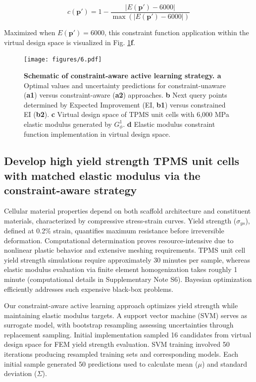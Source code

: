 \documentclass[preprint,review,12pt,authoryear]{elsarticle}
\begin{document}
\begin{equation}
    c(\boldsymbol{p}') = 1 - \frac{|E(\boldsymbol{p}') - 6000|}{\max(|E(\boldsymbol{p}') - 6000|)}
\label{eq:22}
\end{equation}

Maximized when $E(\boldsymbol{p}') = 6000$, this constraint function application within the virtual design space is visualized in Fig. \ref{fig:6}\textbf{f}.

\begin{figure}
    \centering
    \texttt{[image: figures/6.pdf]}
    \caption{\textbf{Schematic of constraint-aware active learning strategy. a} Optimal values and uncertainty predictions for constraint-unaware (\textbf{a1}) versus constraint-aware (\textbf{a2}) approaches. \textbf{b} Next query points determined by Expected Improvement (EI, \textbf{b1}) versus constrained EI (\textbf{b2}). \textbf{c} Virtual design space of TPMS unit cells with 6,000 MPa elastic modulus generated by $G_\phi^1$. \textbf{d} Elastic modulus constraint function implementation in virtual design space.}
    \label{fig:6}
\end{figure}

\subsection{Develop high yield strength TPMS unit cells with matched elastic modulus via the constraint-aware strategy}

Cellular material properties depend on both scaffold architecture and constituent materials, characterized by compressive stress-strain curves. Yield strength ($\sigma_{ys}$), defined at 0.2\% strain, quantifies maximum resistance before irreversible deformation. Computational determination proves resource-intensive due to nonlinear plastic behavior and extensive meshing requirements. TPMS unit cell yield strength simulations require approximately 30 minutes per sample, whereas elastic modulus evaluation via finite element homogenization takes roughly 1 minute (computational details in Supplementary Note S6). Bayesian optimization efficiently addresses such expensive black-box problems.

Our constraint-aware active learning approach optimizes yield strength while maintaining elastic modulus targets. A support vector machine (SVM) serves as surrogate model, with bootstrap resampling assessing uncertainties through replacement sampling. Initial implementation sampled 16 candidates from virtual design space for FEM yield strength evaluation. SVM training involved 50 iterations producing resampled training sets and corresponding models. Each initial sample generated 50 predictions used to calculate mean ($\mu$) and standard deviation ($\Sigma$).
\end{document}
